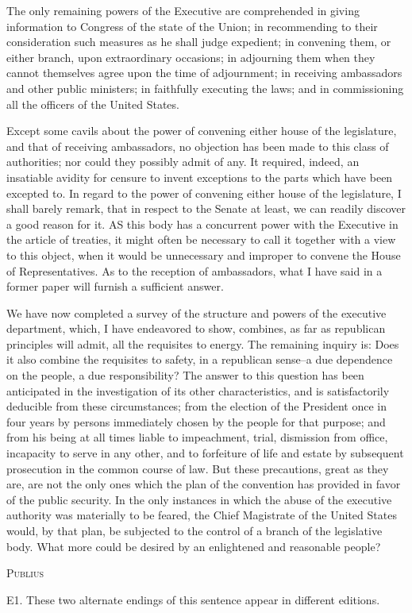 The only remaining powers of the Executive are comprehended in giving information to Congress of the state of the Union; in recommending to their consideration such measures as he shall judge expedient; in convening them, or either branch, upon extraordinary occasions; in adjourning them when they cannot themselves agree upon the time of adjournment; in receiving ambassadors and other public ministers; in faithfully executing the laws; and in commissioning all the officers of the United States.

Except some cavils about the power of convening either house of the legislature, and that of receiving ambassadors, no objection has been made to this class of authorities; nor could they possibly admit of any. It required, indeed, an insatiable avidity for censure to invent exceptions to the parts which have been excepted to. In regard to the power of convening either house of the legislature, I shall barely remark, that in respect to the Senate at least, we can readily discover a good reason for it. AS this body has a concurrent power with the Executive in the article of treaties, it might often be necessary to call it together with a view to this object, when it would be unnecessary and improper to convene the House of Representatives. As to the reception of ambassadors, what I have said in a former paper will furnish a sufficient answer.

We have now completed a survey of the structure and powers of the executive department, which, I have endeavored to show, combines, as far as republican principles will admit, all the requisites to energy. The remaining inquiry is: Does it also combine the requisites to safety, in a republican sense--a due dependence on the people, a due responsibility? The answer to this question has been anticipated in the investigation of its other characteristics, and is satisfactorily deducible from these circumstances; from the election of the President once in four years by persons immediately chosen by the people for that purpose; and from his being at all times liable to impeachment, trial, dismission from office, incapacity to serve in any other, and to forfeiture of life and estate by subsequent prosecution in the common course of law. But these precautions, great as they are, are not the only ones which the plan of the convention has provided in favor of the public security. In the only instances in which the abuse of the executive authority was materially to be feared, the Chief Magistrate of the United States would, by that plan, be subjected to the control of a branch of the legislative body. What more could be desired by an enlightened and reasonable people?

\vspace{.5cm}
\textsc{Publius}

\vspace{1.5cm}

E1. These two alternate endings of this sentence appear in different editions.

